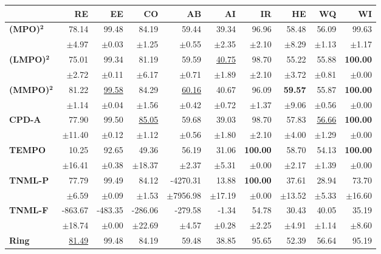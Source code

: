 \begin{table}[!htbp]
\centering
\scriptsize
\begin{tabular}{lrrrrr||rrrr}
\toprule
 & RE & EE & CO & AB & AI & IR & HE & WQ & WI \\
\midrule
\textbf{(MPO)}$\bm{^2}$ & 78.14 & 99.48 & 84.19 & 59.44 & 39.34 & 96.96 & 58.48 & 56.09 & 99.63 \\
 & $\pm$4.97 & $\pm$0.03 & $\pm$1.25 & $\pm$0.55 & $\pm$2.35 & $\pm$2.10 & $\pm$8.29 & $\pm$1.13 & $\pm$1.17 \\
\midrule
\textbf{(LMPO)}$\bm{^2}$ & 75.01 & 99.34 & 81.19 & 59.59 & \underline{40.75} & 98.70 & 55.22 & 55.88 & \textbf{100.00} \\
 & $\pm$2.72 & $\pm$0.11 & $\pm$6.17 & $\pm$0.71 & $\pm$1.89 & $\pm$2.10 & $\pm$3.72 & $\pm$0.81 & $\pm$0.00 \\
\midrule
\textbf{(MMPO)}$\bm{^2}$ & 81.22 & \underline{99.58} & 84.29 & \underline{60.16} & 40.67 & 96.09 & \textbf{59.57} & 55.87 & \textbf{100.00} \\
 & $\pm$1.14 & $\pm$0.04 & $\pm$1.56 & $\pm$0.42 & $\pm$0.72 & $\pm$1.37 & $\pm$9.06 & $\pm$0.56 & $\pm$0.00 \\
\midrule
\textbf{CPD-A} & 77.90 & 99.50 & \underline{85.05} & 59.68 & 39.03 & 98.70 & 57.83 & \underline{56.66} & \textbf{100.00} \\
 & $\pm$11.40 & $\pm$0.12 & $\pm$1.12 & $\pm$0.56 & $\pm$1.80 & $\pm$2.10 & $\pm$4.00 & $\pm$1.29 & $\pm$0.00 \\
\midrule
\textbf{TEMPO} & 10.25 & 92.65 & 49.36 & 56.19 & 31.06 & \textbf{100.00} & 58.70 & 54.13 & \textbf{100.00} \\
 & $\pm$16.41 & $\pm$0.38 & $\pm$18.37 & $\pm$2.37 & $\pm$5.31 & $\pm$0.00 & $\pm$2.17 & $\pm$1.39 & $\pm$0.00 \\
\midrule
\textbf{TNML-P} & 77.79 & 99.49 & 84.12 & -4270.31 & 13.88 & \textbf{100.00} & 37.61 & 28.94 & 73.70 \\
 & $\pm$6.59 & $\pm$0.09 & $\pm$1.53 & $\pm$7956.98 & $\pm$17.19 & $\pm$0.00 & $\pm$13.52 & $\pm$5.33 & $\pm$16.60 \\
\midrule
\textbf{TNML-F} & -863.67 & -483.35 & -286.06 & -279.58 & -1.34 & 54.78 & 30.43 & 40.05 & 35.19 \\
 & $\pm$18.74 & $\pm$0.00 & $\pm$22.69 & $\pm$4.57 & $\pm$0.28 & $\pm$2.25 & $\pm$4.91 & $\pm$1.14 & $\pm$8.60 \\
\midrule
\textbf{Ring} & \underline{81.49} & 99.48 & 84.19 & 59.48 & 38.85 & 95.65 & 52.39 & 56.64 & 95.19 \\

\end{tabular}
\end{table}
